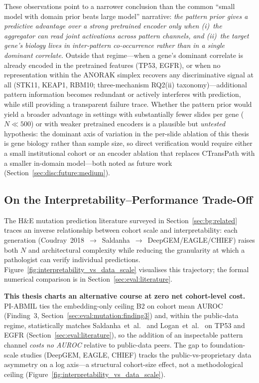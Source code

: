 These observations point to a narrower conclusion than the common
``small model with domain prior beats large model'' narrative:
\emph{the pattern prior gives a predictive advantage over a
strong pretrained encoder only when (i)~the aggregator can read
joint activations across pattern channels, and (ii)~the target
gene's biology lives in inter-pattern co-occurrence rather than in
a single dominant correlate.}
Outside that regime---when a gene's dominant correlate is already
encoded in the pretrained features (TP53, EGFR), or when no
representation within the ANORAK simplex recovers any
discriminative signal at all (STK11, KEAP1, RBM10; three-mechanism
RQ2(ii) taxonomy)---additional pattern information becomes
redundant or actively interferes with prediction, while still
providing a transparent failure trace.
Whether the pattern prior would yield a broader advantage in
settings with substantially fewer slides per gene ($N \ll 500$) or
with weaker pretrained encoders is a plausible but \emph{untested}
hypothesis: the dominant axis of variation in the per-slide
ablation of this thesis is gene biology rather than sample size,
so direct verification would require either a small institutional
cohort or an encoder ablation that replaces CTransPath with a
smaller in-domain model---both noted as future work
(Section~\ref{sec:disc:future:medium}).


\subsection{On the Interpretability--Performance Trade-Off}
\label{sec:disc:interp:tradeoff}

The H\&E mutation prediction literature surveyed in
Section~\ref{sec:bg:related} traces an inverse relationship between
cohort scale and interpretability: each generation
(Coudray~2018~$\to$~Saldanha~$\to$~DeepGEM/EAGLE/CHIEF) raises both
$N$ and architectural complexity while reducing the granularity
at which a pathologist can verify individual predictions.
Figure~\ref{fig:interpretability_vs_data_scale} visualises this
trajectory; the formal numerical comparison is in
Section~\ref{sec:eval:literature}.

\textbf{This thesis charts an alternative course at zero net
cohort-level cost.}
PI-ABMIL ties the embedding-only ceiling B2 on cohort mean AUROC
(Finding~3, Section~\ref{sec:eval:mutation:finding3}) and, within
the public-data regime, statistically matches
Saldanha~et~al.~\cite{saldanha2023npj} and
Logan~et~al.~\cite{logan2022medrxiv} on TP53 and EGFR
(Section~\ref{sec:eval:literature}), so the addition of an
inspectable pattern channel \emph{costs no AUROC} relative to
public-data peers.
The gap to foundation-scale studies (DeepGEM, EAGLE, CHIEF) tracks
the public-vs-proprietary data asymmetry on a log axis---a
structural cohort-size effect, not a methodological ceiling
(Figure~\ref{fig:interpretability_vs_data_scale}).


